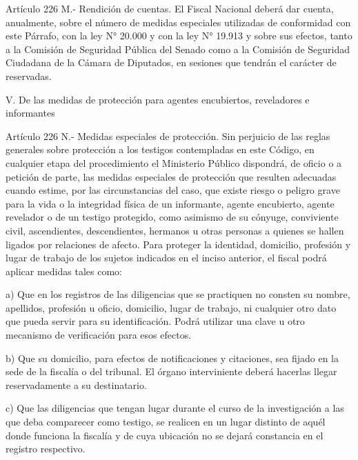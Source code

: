     Artículo 226 M.- Rendición de cuentas. El Fiscal Nacional deberá dar cuenta, anualmente, sobre el número de medidas especiales utilizadas de conformidad con este Párrafo, con la ley N° 20.000 y con la ley N° 19.913 y sobre sus efectos, tanto a la Comisión de Seguridad Pública del Senado como a la Comisión de Seguridad Ciudadana de la Cámara de Diputados, en sesiones que tendrán el carácter de reservadas.

    V. De las medidas de protección para agentes encubiertos, reveladores e informantes


    Artículo 226 N.- Medidas especiales de protección. Sin perjuicio de las reglas generales sobre protección a los testigos contempladas en este Código, en cualquier etapa del procedimiento el Ministerio Público dispondrá, de oficio o a petición de parte, las medidas especiales de protección que resulten adecuadas cuando estime, por las circunstancias del caso, que existe riesgo o peligro grave para la vida o la integridad física de un informante, agente encubierto, agente revelador o de un testigo protegido, como asimismo de su cónyuge, conviviente civil, ascendientes, descendientes, hermanos u otras personas a quienes se hallen ligados por relaciones de afecto.
    Para proteger la identidad, domicilio, profesión y lugar de trabajo de los sujetos indicados en el inciso anterior, el fiscal podrá aplicar medidas tales como:

    a) Que en los registros de las diligencias que se practiquen no consten su nombre, apellidos, profesión u oficio, domicilio, lugar de trabajo, ni cualquier otro dato que pueda servir para su identificación. Podrá utilizar una clave u otro mecanismo de verificación para esos efectos.

    b) Que su domicilio, para efectos de notificaciones y citaciones, sea fijado en la sede de la fiscalía o del tribunal. El órgano interviniente deberá hacerlas llegar reservadamente a su destinatario.

    c) Que las diligencias que tengan lugar durante el curso de la investigación a las que deba comparecer como testigo, se realicen en un lugar distinto de aquél donde funciona la fiscalía y de cuya ubicación no se dejará constancia en el registro respectivo.

